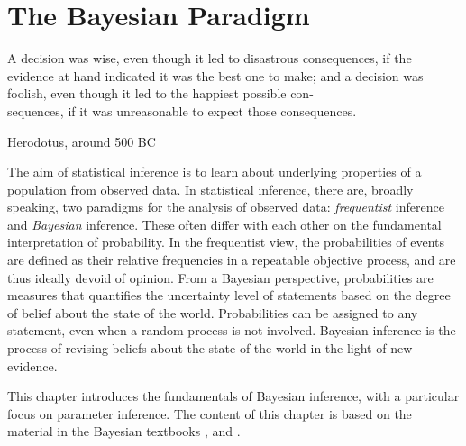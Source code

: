 \chapter{The Bayesian Paradigm}\label{chap:bayesian}

\epigraph{A decision was wise, even though it led to disastrous consequences, if the evidence at hand indicated it was the best one to make; and a decision was foolish, even though it led to the happiest possible con-\\sequences, if it was unreasonable to expect those consequences.}{Herodotus, around 500 BC}


The aim of statistical inference is to learn about underlying properties of a population from observed data.  In statistical inference, there are, broadly speaking, two paradigms for the analysis of observed data: \textit{frequentist} inference and \textit{Bayesian} inference. These often differ with each other on the fundamental interpretation of probability. In the frequentist view, the probabilities of events are defined as their relative frequencies in a repeatable objective process, and are thus ideally devoid of opinion. From a Bayesian perspective, probabilities are measures that quantifies the uncertainty level of statements based on the degree of belief about the state of the world. Probabilities can be assigned to any statement, even when a random process is not involved. Bayesian inference is the process of revising beliefs about the state of the world in the light of new evidence.     



This chapter introduces the fundamentals of Bayesian inference, with a particular focus on parameter inference. The content of this chapter is based on the material in the Bayesian textbooks \cite{BDA}, \cite{BAP} and \cite{Sivia}.


